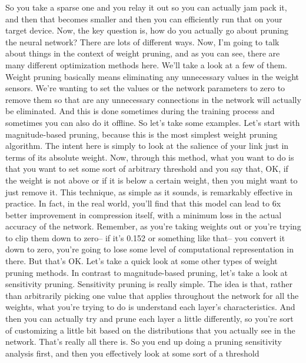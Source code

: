 {{{{{    So you take a sparse one and you relay it out so you can actually jam pack it,
    and then that becomes smaller and then you can efficiently
    run that on your target device.
    Now, the key question is, how do you actually
    go about pruning the neural network?
    There are lots of different ways.
    Now, I'm going to talk about things in the context of weight pruning,
    and as you can see, there are many different optimization methods here.
    We'll take a look at a few of them.
    Weight pruning basically means eliminating any unnecessary values
    in the weight sensors.
    We're wanting to set the values or the network parameters
    to zero to remove them so that are any unnecessary connections in the network
    will actually be eliminated.
    And this is done sometimes during the training process
    and sometimes you can also do it offline.
    So let's take some examples.
    Let's start with magnitude-based pruning,
    because this is the most simplest weight pruning algorithm.
    The intent here is simply to look at the salience of your link
    just in terms of its absolute weight.
    Now, through this method, what you want to do
    is that you want to set some sort of arbitrary threshold
    and you say that, OK, if the weight is not above
    or if it is below a certain weight, then you might want to just remove it.
    This technique, as simple as it sounds, is remarkably effective in practice.
    In fact, in the real world, you'll find that this model
    can lead to 6x better improvement in compression itself,
    with a minimum loss in the actual accuracy of the network.
    Remember, as you're taking weights out or you're
    trying to clip them down to zero--
    if it's 0.152 or something like that-- you convert it down to zero,
    you're going to lose some level of computational representation in there.
    But that's OK.
    Let's take a quick look at some other types of weight pruning methods.
    In contrast to magnitude-based pruning, let's take
    a look at sensitivity pruning.
    Sensitivity pruning is really simple.
    The idea is that, rather than arbitrarily
    picking one value that applies throughout the network for all
    the weights, what you're trying to do is understand
    each layer's characteristics.
    And then you can actually try and prune each layer a little differently,
    so you're sort of customizing a little bit based on the distributions
    that you actually see in the network.
    That's really all there is.
    So you end up doing a pruning sensitivity analysis first,
    and then you effectively look at some sort of a threshold
}}}}}
